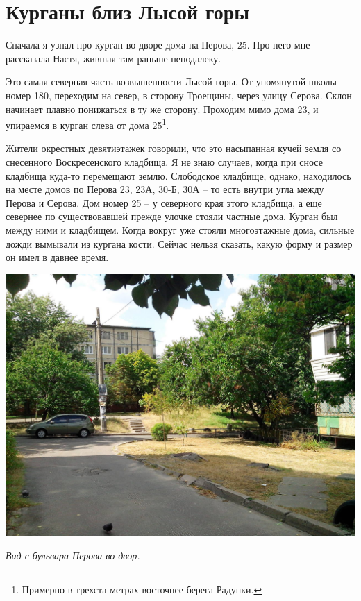 \chapter{Курганы близ Лысой горы}

Сначала я узнал про курган во дворе дома на Перова, 25. Про него мне рассказала Настя, жившая там раньше неподалеку.

Это самая северная часть возвышенности Лысой горы. От упомянутой школы номер 180, переходим на север, в сторону Троещины, через улицу Серова. Склон начинает плавно понижаться в ту же сторону. Проходим мимо дома 23, и упираемся в курган слева от дома 25\footnote{Примерно в трехста метрах восточнее берега Радунки.}.

Жители окрестных девятиэтажек говорили, что это насыпанная кучей земля со снесенного Воскресенского кладбища. Я не знаю случаев, когда при сносе кладбища куда-то перемещают землю. Слободское кладбище, однако, находилось на месте домов по Перова 23, 23А, 30-Б, 30А – то есть внутри угла между Перова и Серова. Дом номер 25 – у северного края этого кладбища, а еще севернее по существовавшей прежде улочке стояли частные дома. Курган был между ними и кладбищем. Когда вокруг уже стояли многоэтажные дома, сильные дожди вымывали из кургана кости. Сейчас нельзя сказать, какую форму и размер он имел в давнее время.

\begin{center}
\includegraphics[width=\linewidth]{chast-gorodki/kurgany/s_IMG_20140806_125032.jpg}

\textit{Вид с бульвара Перова во двор.}
\end{center}


